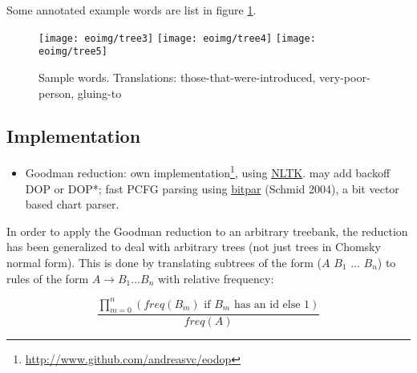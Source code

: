 \documentclass[10pt,a4paper]{article}
\begin{document}
Some annotated example words are list in figure \ref{w1}.

\begin{comment}
\begin{verbatim}
(JJ (JJ (V (V (P en) (V konduk)) (V it)) a) j)

(NN (N (J (J (A mal) (J riĉ)) (A eg)) (A ul)) o)

(VB (P al) (VB (V glu) i))
\end{verbatim}
\end{comment}

\begin{figure}
\texttt{[image: eoimg/tree3]}
\texttt{[image: eoimg/tree4]}
\texttt{[image: eoimg/tree5]}
\caption{Sample words. Translations: those-that-were-introduced, 
very-poor-person, gluing-to}
\label{w1}
\end{figure}

\subsection{Implementation}

\begin{itemize}
\item Goodman reduction: 
own implementation\footnote{\url{http://www.github.com/andreasvc/eodop}}, using 
\href{http://groups.google.com/group/nltk-dev/browse_thread/thread/86ca038723195978/c112b8d171b33d25}{NLTK}. 
may add backoff DOP or DOP*; fast PCFG parsing using 
\href{http://www.ims.uni-stuttgart.de/tcl/SOFTWARE/BitPar.html}{bitpar} 
(Schmid 2004), a bit vector based chart parser.
\end{itemize}

In order to apply the Goodman reduction to an arbitrary treebank, the reduction
has been generalized to deal with arbitrary trees (not just trees in Chomsky
normal form). This is done by translating subtrees of the form 
($A$ $B_1$ ... $B_n$) to rules of the form $A \rightarrow B_1 ... B_n$ with
relative frequency:

\[
\frac{\displaystyle\prod_{m = 0}^n(
\text{$freq(B_m)$ if $B_m$ has an id else $1$})}{freq(A)}
\] 
\end{document}
